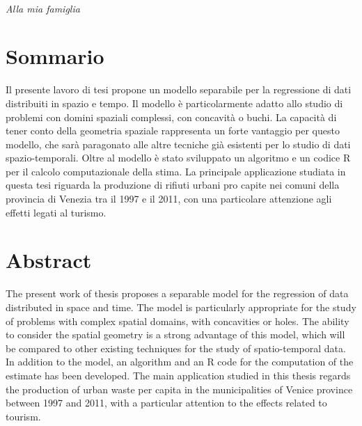 \documentclass[a4paper,11pt,twoside,openright]{book}							%
\begin{document}
\newpage
\thispagestyle{empty}
\ \ \ 
\newpage
\thispagestyle{empty}
\ 
\newline
\newline
\newline
\newline
\newline

\begin{flushright}
\large{\textit{Alla mia famiglia}}
\end{flushright}
\newpage
\thispagestyle{empty}

\chapter*{Sommario}
\label{Cap:sommario}
\thispagestyle{empty}
Il presente lavoro di tesi propone un modello separabile per la regressione di dati distribuiti in spazio e tempo. Il modello è particolarmente adatto allo studio di problemi con domini spaziali complessi, con concavità o buchi. La capacità di tener conto della geometria spaziale rappresenta un forte vantaggio per questo modello, che sarà paragonato alle altre tecniche già esistenti per lo studio di dati spazio-temporali. Oltre al modello è stato sviluppato un algoritmo e un codice R per il calcolo computazionale della stima. La principale applicazione studiata in questa tesi riguarda la produzione di rifiuti urbani pro capite nei comuni della provincia di Venezia tra il 1997 e il 2011, con una particolare attenzione agli effetti legati al turismo.

\newpage
\thispagestyle{empty}
\chapter*{Abstract}
\label{Cap:abstract}
\thispagestyle{empty}
The present work of thesis proposes a separable model for the regression of data distributed in space and time. The model is particularly appropriate for the study of problems with complex spatial domains, with concavities or holes. The ability to consider the spatial geometry is a strong advantage of this model, which will be compared to other existing techniques for the study of spatio-temporal data. In addition to the model, an algorithm and an R code for the computation of the estimate has been developed. The main application studied in this thesis regards the production of urban waste per capita in the municipalities of Venice province between 1997 and 2011, with a particular attention to the effects related to tourism.
\newpage
\thispagestyle{empty}
\end{document}
